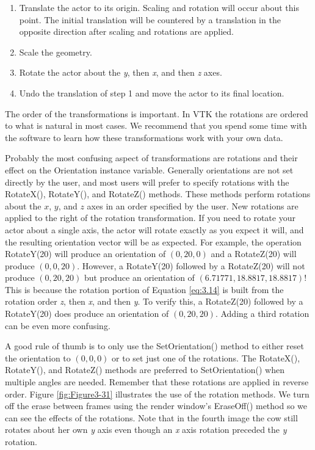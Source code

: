 \begin{enumerate}
\item Translate the actor to its origin. Scaling and rotation will occur about this point. The initial translation will be countered by a translation in the opposite direction after scaling and rotations are applied.

\item Scale the geometry.

\item Rotate the actor about the \emph{y}, then \emph{x}, and then \emph{z} axes.

\item Undo the translation of step 1 and move the actor to its final location.
\end{enumerate}

The order of the transformations is important. In VTK the rotations are ordered to what is natural in most cases. We recommend that you spend some time with the software to learn how these transformations work with your own data.

Probably the most confusing aspect of transformations are rotations and their effect on the Orientation instance variable. Generally orientations are not set directly by the user, and most users will prefer to specify rotations with the RotateX(), RotateY(), and RotateZ() methods. These methods perform rotations about the $x$, $y$, and $z$ axes in an order specified by the user. New rotations are applied to the right of the rotation transformation. If you need to rotate your actor about a single axis, the actor will rotate exactly as you expect it will, and the resulting orientation vector will be as expected. For example, the operation RotateY(20) will produce an orientation of $(0,20,0)$ and a RotateZ(20) will produce $(0,0,20)$. However, a RotateY(20) followed by a RotateZ(20) will not produce $(0,20,20)$ but produce an orientation of $(6.71771, 18.8817, 18.8817)$! This is because the rotation portion of Equation \eqref{eq:3.14} is built from the rotation order \emph{z}, then \emph{x}, and then \emph{y}. To verify this, a RotateZ(20) followed by a RotateY(20) does produce an orientation of $(0,20,20)$. Adding a third rotation can be even more confusing.

A good rule of thumb is to only use the SetOrientation() method to either reset the orientation to $(0,0,0)$ or to set just one of the rotations. The RotateX(), RotateY(), and RotateZ() methods are preferred to SetOrientation() when multiple angles are needed. Remember that these rotations are applied in reverse order. Figure \ref{fig:Figure3-31} illustrates the use of the rotation methods. We turn off the erase between frames using the render window's EraseOff() method so we can see the effects of the rotations. Note that in the fourth image the cow still rotates about her own \emph{y} axis even though an \emph{x} axis rotation preceded the \emph{y} rotation.

